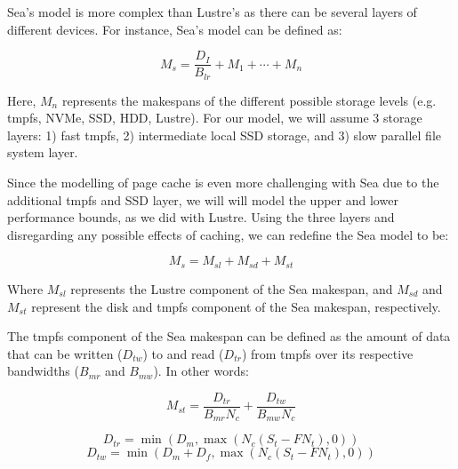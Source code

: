       Sea's model is more complex than Lustre's as there can be several
      layers of different devices. For instance, Sea's model can be defined as:

      \begin{equation}\label{eq:sea}
          M_{s} = \frac{D_{I}}{B_{lr}} + M_{1} + \cdots + M_{n}
      \end{equation}

      Here, $M_{n}$ represents the makespans of the different possible storage levels
      (e.g. tmpfs, NVMe, SSD, HDD, Lustre). For our model, we will assume 3 storage layers:
      1) fast tmpfs, 2) intermediate local SSD storage, and 3) slow parallel file system layer.

      Since the modelling of page cache is even more challenging with Sea due to the additional tmpfs
      and SSD layer, we will will model the upper and lower performance bounds, as we did with Lustre.
      Using the three layers and disregarding any possible effects of caching, we can redefine the
      Sea model to be:

      \begin{equation}\label{eq:snc}
          M_{s} = M_{sl} + M_{sd} + M_{st}
      \end{equation}

         Where $M_{sl}$ represents the Lustre component of the Sea makespan, and
      $M_{sd}$ and $M_{st}$ represent the disk and tmpfs component of the Sea
      makespan, respectively.

      The tmpfs component of the Sea makespan can be defined as the amount of
      data that can be written ($D_{tw}$) to and read ($D_{tr}$) from tmpfs
      over its respective bandwidths ($B_{mr}$ and $B_{mw}$). In other words:

      \begin{equation}\label{eq:mst}
          M_{st} = \frac{D_{tr}}{B_{mr}N_{c}} + \frac{D_{tw}}{B_{mw}N_{c}}
      \end{equation}

      \begin{equation*}\label{eq:dtr}
          D_{tr} = \min\left(D_{m}, \max{\left(N_{c}(S_{t} - FN_{t}), 0 \right)} \right)
      \end{equation*}
      \begin{equation*}\label{eq:dtw}
          D_{tw} = \min\left(D_{m} + D_{f}, \max{\left(N_{c}(S_{t} - FN_{t}), 0 \right)} \right)
      \end{equation*}

